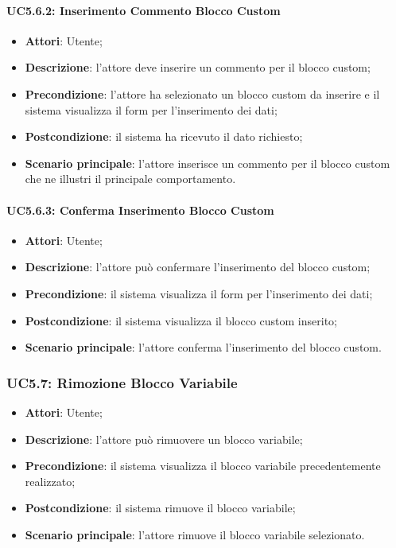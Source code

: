 \begin{itemize}
\begin{itemize}
\begin{itemize}
\begin{itemize}
\paragraph{UC5.6.2: Inserimento Commento Blocco Custom}
\label{UC5.6.2}
\begin{itemize}
	\item \textbf{Attori}: Utente;
	\item \textbf{Descrizione}: l'attore deve inserire un commento per il blocco custom;
	\item \textbf{Precondizione}: l'attore ha selezionato un blocco custom da inserire e il sistema visualizza il form per l'inserimento dei dati;
	\item \textbf{Postcondizione}: il sistema ha ricevuto il dato richiesto;
	\item \textbf{Scenario principale}: l'attore inserisce un commento per il blocco custom che ne illustri il principale comportamento.
\end{itemize}

\paragraph{UC5.6.3: Conferma Inserimento Blocco Custom}
\label{UC5.6.3}
\begin{itemize}
	\item \textbf{Attori}: Utente;
	\item \textbf{Descrizione}: l'attore può confermare l'inserimento del blocco custom;
	\item \textbf{Precondizione}: il sistema visualizza il form per l'inserimento dei dati;
	\item \textbf{Postcondizione}: il sistema visualizza il blocco custom inserito;
	\item \textbf{Scenario principale}: l'attore conferma l'inserimento del blocco custom.
\end{itemize}

\subsubsection{UC5.7: Rimozione Blocco Variabile}
\label{UC5.7}
\begin{itemize}
	\item \textbf{Attori}: Utente;
	\item \textbf{Descrizione}: l'attore può rimuovere un blocco variabile;
	\item \textbf{Precondizione}: il sistema visualizza il blocco variabile precedentemente realizzato;
	\item \textbf{Postcondizione}: il sistema rimuove il blocco variabile;
	\item \textbf{Scenario principale}: l'attore rimuove il blocco variabile selezionato.
\end{itemize}


\end{itemize}
\end{itemize}
\end{itemize}
\end{itemize}
